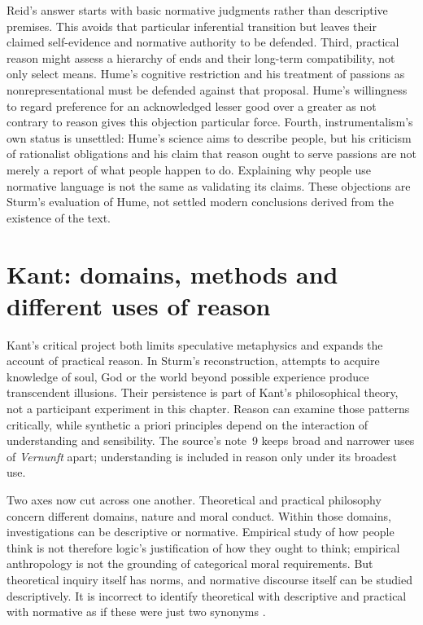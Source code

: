 Reid's answer starts with basic normative judgments rather than
descriptive premises. This avoids that particular inferential transition
but leaves their claimed self-evidence and normative authority to be
defended. Third, practical reason might assess a hierarchy of ends and
their long-term compatibility, not only select means. Hume's cognitive
restriction and his treatment of passions as nonrepresentational must
be defended against that proposal.
Hume's willingness to regard preference for an acknowledged lesser good
over a greater as not contrary to reason gives this objection particular force.
Fourth, instrumentalism's own status
is unsettled: Hume's science aims to describe people, but his criticism
of rationalist obligations and his claim that reason ought to serve
passions are not merely a report of what people happen to do. Explaining
why people use normative language is not the same as validating its
claims. These objections are Sturm's evaluation of Hume, not settled
modern conclusions derived from the existence of the text.

\section{Kant: domains, methods and different uses of reason}
\label{sec:p13-r11-kant}

Kant's critical project both limits speculative metaphysics and expands
the account of practical reason. In Sturm's reconstruction, attempts
to acquire knowledge of soul, God or the world beyond possible experience
produce transcendent illusions. Their persistence is part of Kant's
philosophical theory, not a participant experiment in this chapter.
Reason can examine those patterns critically, while synthetic a priori
principles depend on the interaction of understanding and sensibility.
The source's note~9 keeps broad and narrower uses of \emph{Vernunft}
apart; understanding is included in reason only under its broadest use.

Two axes now cut across one another. Theoretical and practical
philosophy concern different domains, nature and moral conduct. Within
those domains, investigations can be descriptive or normative. Empirical
study of how people think is not therefore logic's justification of
how they ought to think; empirical anthropology is not the grounding
of categorical moral requirements. But theoretical inquiry itself
has norms, and normative discourse itself can be studied descriptively.
It is incorrect to identify theoretical with descriptive and practical
with normative as if these were just two synonyms
\parencite[pp.~78--80]{Sturm2021DescriptiveNormativeHistory}.

